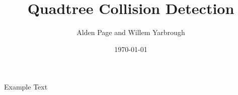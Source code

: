 \documentclass{beamer}
\title{\huge Quadtree Collision Detection}
\author[Page and Yarbrough]{Alden Page and Willem Yarbrough}
\institute[Allegheny College]{Department of Computer Science \\ Allegheny College}
\date{\today}
\begin{document}
\begin{frame}
  \titlepage
\end{frame}

\begin{frame}
    \huge{Example Text}\normalsize
\end{frame}
\end{document}
